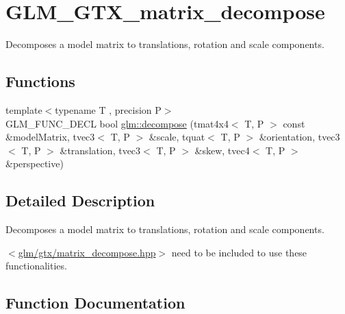 \hypertarget{group__gtx__matrix__decompose}{}\section{G\+L\+M\+\_\+\+G\+T\+X\+\_\+matrix\+\_\+decompose}
\label{group__gtx__matrix__decompose}


Decomposes a model matrix to translations, rotation and scale components.  


\subsection*{Functions}
\begin{DoxyCompactItemize}
\item 
{\footnotesize template$<$typename T , precision P$>$ }\\G\+L\+M\+\_\+\+F\+U\+N\+C\+\_\+\+D\+E\+C\+L bool \hyperlink{group__gtx__matrix__decompose_ga0f1245817507156b337798a253577c8b}{glm\+::decompose} (tmat4x4$<$ T, P $>$ const \&model\+Matrix, tvec3$<$ T, P $>$ \&scale, tquat$<$ T, P $>$ \&orientation, tvec3$<$ T, P $>$ \&translation, tvec3$<$ T, P $>$ \&skew, tvec4$<$ T, P $>$ \&perspective)
\end{DoxyCompactItemize}


\subsection{Detailed Description}
Decomposes a model matrix to translations, rotation and scale components. 

$<$\hyperlink{matrix__decompose_8hpp}{glm/gtx/matrix\+\_\+decompose.\+hpp}$>$ need to be included to use these functionalities. 

\subsection{Function Documentation}
\hypertarget{group__gtx__matrix__decompose_ga0f1245817507156b337798a253577c8b}{}
